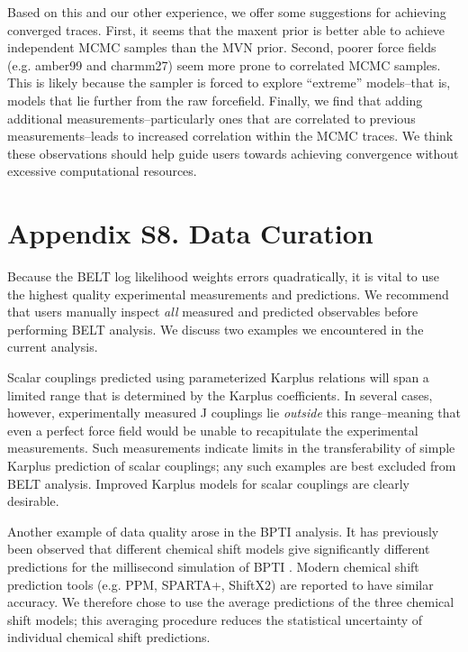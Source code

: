 \documentclass[journal=jacsat,manuscript=article]{achemso}
\begin{document}
Based on this and our other experience, we offer some suggestions for achieving converged traces.  First, it seems that the maxent prior is better able to achieve independent MCMC samples than the MVN prior.  Second, poorer force fields (e.g. amber99 and charmm27) seem more prone to correlated MCMC samples.  This is likely because the sampler is forced to explore ``extreme'' models--that is, models that lie further from the raw forcefield.  Finally, we find that adding additional measurements--particularly ones that are correlated to previous measurements--leads to increased correlation within the MCMC traces.  We think these observations should help guide users towards achieving convergence without excessive computational resources.  

\newpage

\section{Appendix S8. Data Curation}

Because the BELT log likelihood weights errors quadratically, it is vital to use the highest quality experimental measurements and predictions.  We recommend that users manually inspect \emph{all} measured and predicted observables before performing BELT analysis.  We discuss two examples we encountered in the current analysis.  

Scalar couplings predicted using parameterized Karplus relations will span a limited range that is determined by the Karplus coefficients.  In several cases, however, experimentally measured J couplings lie \emph{outside} this range--meaning that even a perfect force field would be unable to recapitulate the experimental measurements.  Such measurements indicate limits in the transferability of simple Karplus prediction of scalar couplings; any such examples are best excluded from BELT analysis.  Improved  Karplus models for scalar couplings are clearly desirable.  

Another example of data quality arose in the BPTI analysis.  It has previously been observed that different chemical shift models give significantly different predictions for the millisecond simulation of BPTI \cite{xue2012microsecond}.  Modern chemical shift prediction tools (e.g. PPM, SPARTA+, ShiftX2) are reported to have similar accuracy.  We therefore chose to use the average predictions of the three chemical shift models; this averaging procedure reduces the statistical uncertainty of individual chemical shift predictions.  

\newpage


\end{document}
